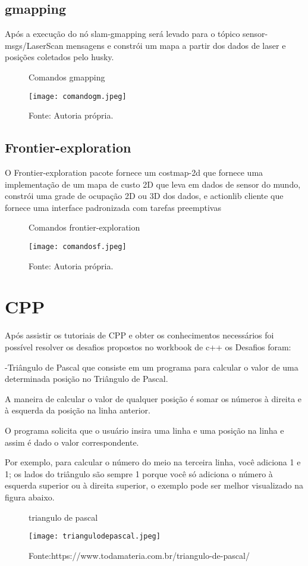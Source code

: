 \subsection{gmapping}
Após a execução do nó slam-gmapping será levado para o tópico sensor-msgs/LaserScan mensagens e constrói um mapa a partir dos dados de laser e posições coletados pelo husky.
\begin{figure} [h!]	
    \centering
    \caption{Comandos gmapping}
    \texttt{[image: comandogm.jpeg]}
    \caption*{Fonte: Autoria própria.}
    \label{fig:gmapping}
\end{figure}
\subsection{Frontier-exploration}
O Frontier-exploration pacote fornece um costmap-2d que fornece uma implementação de um mapa de custo 2D que leva em dados de sensor do mundo, constrói uma grade de ocupação 2D ou 3D dos dados, e actionlib cliente que fornece uma interface padronizada com tarefas preemptivas
\begin{figure} [h!]	
    \centering
    \caption{Comandos frontier-exploration }
    \texttt{[image: comandosf.jpeg]}
    \caption*{Fonte: Autoria própria.}
    \label{fig:frontier-exploration}
\end{figure}
\section{CPP}
Após assistir os tutoriais de CPP e obter os conhecimentos necessários foi possível resolver os desafios propostos no workbook de c++ os Desafios foram: 

    -Triângulo de Pascal que consiste em um programa para calcular o valor de uma determinada posição no Triângulo de Pascal.

    A maneira de calcular o valor de qualquer posição é somar os números à direita e à esquerda da posição na linha anterior.

   O programa solicita que o usuário insira uma linha e uma posição na linha e assim é dado o valor correspondente.

   Por exemplo, para calcular o número do meio na terceira linha, você adiciona 1 e 1; os lados do triângulo são sempre 1 porque você só adiciona o número à esquerda superior ou à direita superior, o exemplo pode ser melhor visualizado na figura abaixo.

\begin{figure} [h!]	
    \centering
    \caption{triangulo de pascal}
    \texttt{[image: triangulodepascal.jpeg]}
    \caption*{Fonte:https://www.todamateria.com.br/triangulo-de-pascal/}
    \label{fig:triangulodepascal}
\end{figure}


